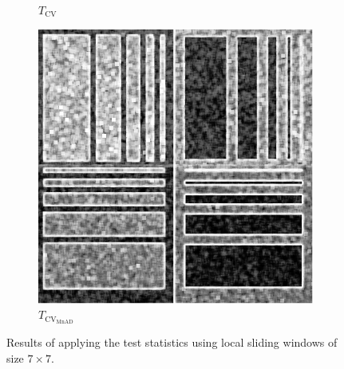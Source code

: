 \documentclass[aspectratio=1610,10pt]{beamer}
\begin{document}
\begin{frame}
\begin{figure}[H]
\begin{subfigure}[b]{0.3\textwidth}
    \caption{$T_\text{CV}$}
    \label{fig:sim_results-2}
  \end{subfigure}
  \hfill
  \begin{subfigure}[b]{0.3\textwidth}
    \centering
    \includegraphics[width=\textwidth]{../../Figures/PNG/mnad_Phantom_z1}
    \caption{$T_{\text{CV}_{\text{MnAD}}}$}
    \label{fig:sim_results-3}
  \end{subfigure}
  \caption{Results of applying the test statistics using local sliding windows of size \(7\times 7\).}
  \label{fig:sim_results}
\end{figure}
 
\end{frame} 
\end{document}
